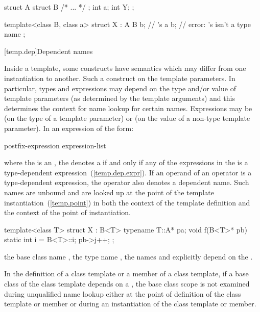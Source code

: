 \begin{codeblock}
struct A {
	struct B { /* ... */ };
	int a;
	int Y;
};

template<class B, class a> struct X : A {
	B b;			// 's 
	a b;			// error: 's  isn't a type name
};
\end{codeblock}
\exitexampleb

[temp.dep]{Dependent names}

\pnum
{}%
Inside a template, some constructs have semantics which may differ from one
instantiation to another.
Such a construct
on the template parameters.
In particular, types and expressions may depend on the type
and/or
value of
template parameters (as determined by the template arguments) and this determines
the context for name lookup for certain names.
Expressions may be
(on the type of a template parameter) or
(on the value of a non-type template parameter).
In an expression of the form:

\begin{ncbnftab}
postfix-expression \terminal{(} expression-list\opt \terminal{)}
\end{ncbnftab}

where the
is an
,
the
denotes a
%
if and only if any of the expressions in the
is a type-dependent expression~(\ref{temp.dep.expr}).
If an operand of an operator is a type-dependent expression, the operator
also denotes a dependent name.
Such names are unbound and
are looked up at the point of the template instantiation~(\ref{temp.point}) in
both the context of the template definition and the
context of the point of instantiation.

\pnum
\enterexample
\begin{codeblock}
template<class T> struct X : B<T> {
	typename T::A* pa;
	void f(B<T>* pb) {
		static int i = B<T>::i;
		pb->j++;
	}
};
\end{codeblock}

the base class name
,
the type name
,
the names
and
explicitly depend on the
.
\exitexampleb

\pnum
In the definition of a class template or a member of a class template,
if a base class of the class template depends on a
,
the base class scope is not examined during unqualified
name lookup either at the point of definition of the
class template or member or during an instantiation of
the class template or member.
\enterexample

